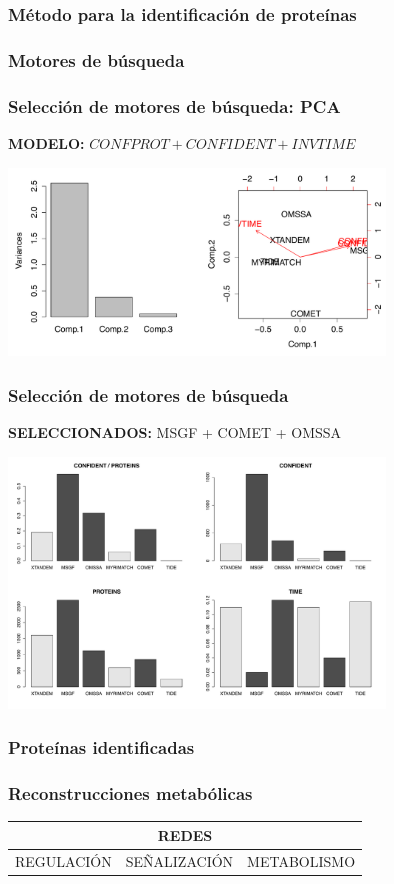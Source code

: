 \documentclass[10pt]{beamer}
\begin{document}
\begin{frame}
\frametitle{Método para la identificación de proteínas}
\end{frame}
\begin{frame}
\frametitle{Motores de búsqueda}
\end{frame}
\begin{frame}
\frametitle{Selección de motores de búsqueda: PCA}
\begin{center}
\textbf{MODELO:} $CONFPROT + CONFIDENT + INVTIME$
\end{center}
\begin{center}
\includegraphics[width=10cm]{imagenes/PCA}
\end{center}
\end{frame}
\begin{frame}
\frametitle{Selección de motores de búsqueda}
\begin{center}
\textbf{SELECCIONADOS:} MSGF + COMET + OMSSA 
\end{center}
\begin{center}
\includegraphics[width=10cm]{imagenes/ENGINES}
\end{center}
\end{frame}
\begin{frame}
\frametitle{Proteínas identificadas}
\end{frame}
\begin{frame}
\frametitle{Reconstrucciones metabólicas}
\begin{center}
\begin{tabular}{|c|c|c|}
\hline
\multicolumn{3}{|c|}{\textbf{REDES}}\\
\hline
\hline
REGULACIÓN&SEÑALIZACIÓN&METABOLISMO\\
\hline
\end{tabular}
\end{center}\end{frame}
\end{document}
